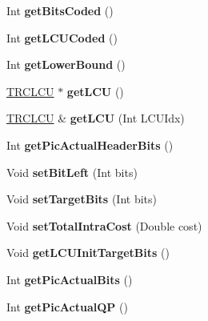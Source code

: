 \begin{DoxyCompactItemize}
Int {\bfseries get\+Bits\+Coded} ()
\item 
\mbox{\label{class_t_enc_r_c_pic_a30ed608bb6d8c6c6ebf726719995f05a}} 
Int {\bfseries get\+L\+C\+U\+Coded} ()
\item 
\mbox{\label{class_t_enc_r_c_pic_abe029498e7de506a8adec7eb29fdceaa}} 
Int {\bfseries get\+Lower\+Bound} ()
\item 
\mbox{\label{class_t_enc_r_c_pic_a259a3cea94eb85cc32028a148848457d}} 
\hyperlink{struct_t_r_c_l_c_u}{T\+R\+C\+L\+CU} $\ast$ {\bfseries get\+L\+CU} ()
\item 
\mbox{\label{class_t_enc_r_c_pic_adac26cea3dcc68bc2187332628c2b341}} 
\hyperlink{struct_t_r_c_l_c_u}{T\+R\+C\+L\+CU} \& {\bfseries get\+L\+CU} (Int L\+C\+U\+Idx)
\item 
\mbox{\label{class_t_enc_r_c_pic_aefcac72cd634e0764581680d4205cb59}} 
Int {\bfseries get\+Pic\+Actual\+Header\+Bits} ()
\item 
\mbox{\label{class_t_enc_r_c_pic_af7106f2d14eceab070e71b82b293f97e}} 
Void {\bfseries set\+Bit\+Left} (Int bits)
\item 
\mbox{\label{class_t_enc_r_c_pic_a4bf4b8045c0b559e5cf5613747012066}} 
Void {\bfseries set\+Target\+Bits} (Int bits)
\item 
\mbox{\label{class_t_enc_r_c_pic_a7c98a22d41d08b46ee2bef0dec977e0a}} 
Void {\bfseries set\+Total\+Intra\+Cost} (Double cost)
\item 
\mbox{\label{class_t_enc_r_c_pic_a37f43ef8065b4d5dabb0d7814f364d29}} 
Void {\bfseries get\+L\+C\+U\+Init\+Target\+Bits} ()
\item 
\mbox{\label{class_t_enc_r_c_pic_ae3274c7b089029cd985e7192a8e5243d}} 
Int {\bfseries get\+Pic\+Actual\+Bits} ()
\item 
\mbox{\label{class_t_enc_r_c_pic_ad0edbdf60a6c3f31bef50255cb55ae11}} 
Int {\bfseries get\+Pic\+Actual\+QP} ()

\end{DoxyCompactItemize}
